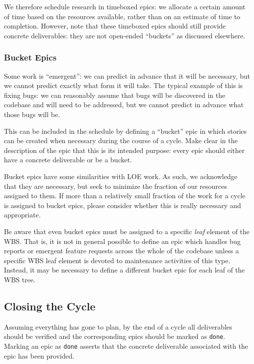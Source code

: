 We therefore schedule research in \gls{timebox}ed \glspl{epic}: we allocate a certain amount of time based on the resources available, rather than on an estimate of time to completion.
However, note that these \gls{timebox}ed \glspl{epic} should still provide concrete deliverables: they are not open-ended ``buckets'' as discussed elsewhere.

\subsubsection{Bucket Epics}
\label{sec:bucket}

Some work is ``emergent'': we can predict in advance that it will be necessary, but we cannot predict exactly what form it will take.
The typical example of this is fixing bugs: we can reasonably assume that bugs will be discovered in the codebase and will need to be addressed, but we cannot predict in advance what those bugs will be.

This can be included in the schedule by defining a ``bucket'' \gls{epic} in which stories can be created when necessary during the course of a \gls{cycle}.
Make clear in the description of the \gls{epic} that this is its intended purpose: every \gls{epic} should either have a concrete deliverable or be a bucket.

Bucket \glspl{epic} have some similarities with \gls{LOE} work.
As such, we acknowledge that they are necessary, but seek to minimize the fraction of our resources assigned to them.
If more than a relatively small fraction of the work for a \gls{cycle} is assigned to bucket \glspl{epic}, please consider whether this is really necessary and appropriate.

Be aware that even bucket \glspl{epic} must be assigned to a specific \emph{leaf} \gls{element} of the \gls{WBS}.
That is, it is not in general possible to define an \gls{epic} which handles bug reports or emergent feature requests across the whole of the codebase unless a specific \gls{WBS} leaf \gls{element} is devoted to maintenance activities of this type.
Instead, it may be necessary to define a different bucket \gls{epic} for each leaf of the \gls{WBS} tree.


\subsection{Closing the Cycle}
\label{sec:cycle-close}

Assuming everything has gone to plan, by the end of a \gls{cycle} all deliverables should be verified and the corresponding \glspl{epic} should be marked as \texttt{done}.
Marking an \gls{epic} as \texttt{done} asserts that the concrete deliverable associated with the \gls{epic} has been provided.

